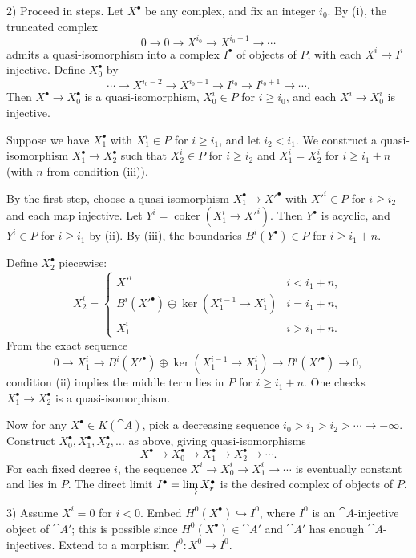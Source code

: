 2) Proceed in steps. Let \(X^\bullet\) be any complex, and fix an integer \(i_0\). By (i), the truncated complex
\[
0\to 0\to X^{i_0}\to X^{i_0+1}\to\cdots
\]
admits a quasi-isomorphism into a complex \(I^\bullet\) of objects of \(P\), with each \(X^i\to I^i\) injective. Define \(X_0^\bullet\) by
\[
\cdots\to X^{i_0-2}\to X^{i_0-1}\to I^{i_0}\to I^{i_0+1}\to\cdots.
\]
Then \(X^\bullet\to X_0^\bullet\) is a quasi-isomorphism, \(X_0^i\in P\) for \(i\ge i_0\), and each \(X^i\to X_0^i\) is injective.

Suppose we have \(X_1^\bullet\) with \(X_1^i\in P\) for \(i\ge i_1\), and let \(i_2<i_1\). We construct a quasi-isomorphism \(X_1^\bullet\to X_2^\bullet\) such that \(X_2^i\in P\) for \(i\ge i_2\) and \(X_1^i=X_2^i\) for \(i\ge i_1+n\) (with \(n\) from condition (iii)).

\setcounter{page}{44}
By the first step, choose a quasi-isomorphism \(X_1^\bullet\to X'^\bullet\) with \(X'^i\in P\) for \(i\ge i_2\) and each map injective. Let \(Y^i=\operatorname{coker}(X_1^i\to X'^i)\). Then \(Y^\bullet\) is acyclic, and \(Y^i\in P\) for \(i\ge i_1\) by (ii). By (iii), the boundaries \(B^i(Y^\bullet)\in P\) for \(i\ge i_1+n\).

Define \(X_2^\bullet\) piecewise:
\[
X_2^i=
\begin{cases}
X'^i & i < i_1+n,\\
B^i(X'^\bullet)\oplus \ker(X_1^{i-1}\to X_1^i) & i = i_1+n,\\
X_1^i & i > i_1+n.
\end{cases}
\]
From the exact sequence
\[
0\to X_1^i\to B^i(X'^\bullet)\oplus \ker(X_1^{i-1}\to X_1^i)\to B^i(X'^\bullet)\to 0,
\]
condition (ii) implies the middle term lies in \(P\) for \(i\ge i_1+n\). One checks \(X_1^\bullet\to X_2^\bullet\) is a quasi-isomorphism.

Now for any \(X^\bullet\in K(\cat{A})\), pick a decreasing sequence \(i_0>i_1>i_2>\cdots\to-\infty\). Construct \(X_0^\bullet,X_1^\bullet,X_2^\bullet,\dots\) as above, giving quasi-isomorphisms
\[
X^\bullet\to X_0^\bullet\to X_1^\bullet\to X_2^\bullet\to\cdots.
\]
For each fixed degree \(i\), the sequence \(X^i\to X_0^i\to X_1^i\to\cdots\) is eventually constant and lies in \(P\). The direct limit \(I^\bullet=\varinjlim X_r^\bullet\) is the desired complex of objects of \(P\).

\setcounter{page}{45}
3) Assume \(X^i=0\) for \(i<0\). Embed \(H^0(X^\bullet)\hookrightarrow I^0\), where \(I^0\) is an \(\cat{A}\)-injective object of \(\cat{A}'\); this is possible since \(H^0(X^\bullet)\in\cat{A}'\) and \(\cat{A}'\) has enough \(\cat{A}\)-injectives. Extend to a morphism \(f^0\colon X^0\to I^0\).

